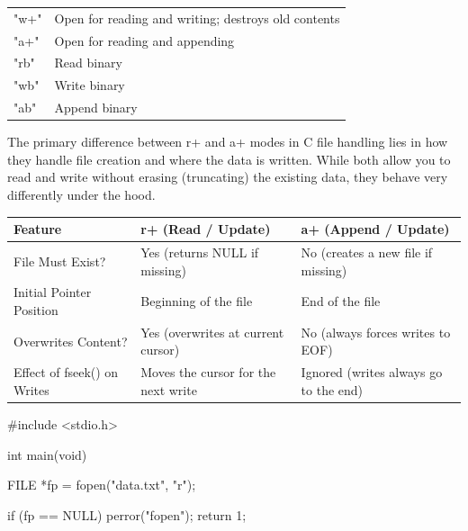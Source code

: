 \documentclass{report}
\begin{document}
\begin{itemize}
\begin{center}
\begin{tabularx}{\textwidth}{@{}lX@{}}
                    "w+"	&Open for reading and writing; destroys old contents\\[2ex]
                    "a+"	&Open for reading and appending\\[2ex]
                    "rb"	&Read binary\\[2ex]
                    "wb"	&Write binary\\[2ex]
                    "ab"	&Append binary \\
                    \bottomrule
                \end{tabularx}
            \end{center}
            \bigbreak \noindent 
            The primary difference between r+ and a+ modes in C file handling lies in how they handle file creation and where the data is written. While both allow you to read and write without erasing (truncating) the existing data, they behave very differently under the hood. 
            \bigbreak \noindent 
            \begin{center}
                \begin{tabularx}{\textwidth}{@{}XXX@{}}
                    \toprule
                    \textbf{Feature}& \textbf{r+ (Read / Update)}&	\textbf{a+ (Append / Update)} \\
                    \midrule
                    File Must Exist?	&Yes (returns NULL if missing)	&No (creates a new file if missing)\\[2ex]
                    Initial Pointer Position	&Beginning of the file	&End of the file\\[2ex]
                    Overwrites Content?	&Yes (overwrites at current cursor)	&No (always forces writes to EOF)\\[2ex]
                    Effect of fseek() on Writes	&Moves the cursor for the next write	&Ignored (writes always go to the end) \\ 
                    \bottomrule
                \end{tabularx}
            \end{center}
            \bigbreak \noindent 
            \begin{cppcode}
                #include <stdio.h>

                int main(void) {
                    FILE *fp = fopen("data.txt", "r");

                    if (fp == NULL) {
                        perror("fopen");
                        return 1;
                    }

}
\end{cppcode}
\end{itemize}
\end{document}
